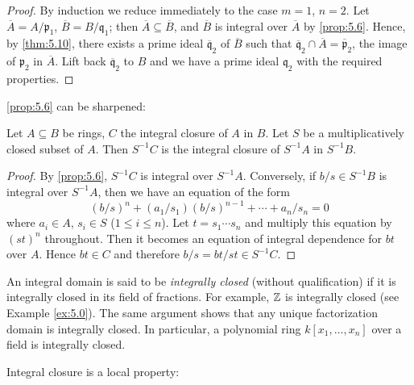 \begin{proof}
By induction we reduce immediately to the case $m = 1$, $n = 2$. Let $\overline{A} = A/\mathfrak{p}_1$, $\overline{B} = B/\mathfrak{q}_1$; then $\overline{A} \subseteq \overline{B}$, and $\overline{B}$ is integral over $\overline{A}$ by \eqref{prop:5.6}. Hence, by \eqref{thm:5.10}, there exists a prime ideal $\overline{\mathfrak{q}}_2$ of $\overline{B}$ such that $\overline{\mathfrak{q}}_2 \cap \overline{A} = \overline{\mathfrak{p}}_2$, the image of $\mathfrak{p}_2$ in $\overline{A}$. Lift back $\overline{\mathfrak{q}}_2$ to $B$ and we have a prime ideal $\mathfrak{q}_2$ with the required properties.
\end{proof}


\eqref{prop:5.6} can be sharpened:

\begin{proposition}\label{prop:5.12}
Let $A \subseteq B$ be rings, $C$ the integral closure of $A$ in $B$. Let $S$ be a multiplicatively closed subset of $A$. Then $S^{-1}C$ is the integral closure of $S^{-1}A$ in $S^{-1}B$.
\end{proposition}

\begin{proof}
By \eqref{prop:5.6}, $S^{-1}C$ is integral over $S^{-1}A$. Conversely, if $b/s \in S^{-1}B$ is integral over $S^{-1}A$, then we have an equation of the form
\[
(b/s)^n + (a_1/s_1)(b/s)^{n-1} + \cdots + a_n/s_n = 0
\]
where $a_i \in A$, $s_i \in S$ ($1 \leq i \leq n$). Let $t = s_1 \cdots s_n$ and multiply this equation by $(st)^n$ throughout. Then it becomes an equation of integral dependence for $bt$ over $A$. Hence $bt \in C$ and therefore $b/s = bt/st \in S^{-1}C$.
\end{proof}

An integral domain is said to be \emph{integrally closed} (without qualification) if it is integrally closed in its field of fractions. For example, $\mathbb{Z}$ is integrally closed (see Example \eqref{ex:5.0}). The same argument shows that any unique factorization domain is integrally closed. In particular, a polynomial ring $k[x_1, \ldots, x_n]$ over a field is integrally closed.

Integral closure is a local property:

